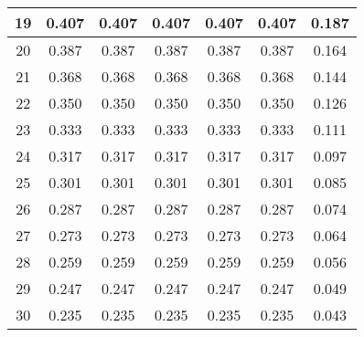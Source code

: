 \begin{table}
\begin{tabular}{|l|l|l|l|l|l|l|}
\hline
\multicolumn{1}{|c|}{19} & \multicolumn{1}{c|}{0.407} & \multicolumn{1}{c|}{0.407} & \multicolumn{1}{c|}{0.407} & \multicolumn{1}{c|}{0.407} & \multicolumn{1}{c|}{0.407} & \multicolumn{1}{c|}{0.187} \\ 
\hline
\multicolumn{1}{|c|}{20} & \multicolumn{1}{c|}{0.387} & \multicolumn{1}{c|}{0.387} & \multicolumn{1}{c|}{0.387} & \multicolumn{1}{c|}{0.387} & \multicolumn{1}{c|}{0.387} & \multicolumn{1}{c|}{0.164} \\ 
\hline
\multicolumn{1}{|c|}{21} & \multicolumn{1}{c|}{0.368} & \multicolumn{1}{c|}{0.368} & \multicolumn{1}{c|}{0.368} & \multicolumn{1}{c|}{0.368} & \multicolumn{1}{c|}{0.368} & \multicolumn{1}{c|}{0.144} \\ 
\hline
\multicolumn{1}{|c|}{22} & \multicolumn{1}{c|}{0.350} & \multicolumn{1}{c|}{0.350} & \multicolumn{1}{c|}{0.350} & \multicolumn{1}{c|}{0.350} & \multicolumn{1}{c|}{0.350} & \multicolumn{1}{c|}{0.126} \\ 
\hline
\multicolumn{1}{|c|}{23} & \multicolumn{1}{c|}{0.333} & \multicolumn{1}{c|}{0.333} & \multicolumn{1}{c|}{0.333} & \multicolumn{1}{c|}{0.333} & \multicolumn{1}{c|}{0.333} & \multicolumn{1}{c|}{0.111} \\ 
\hline
\multicolumn{1}{|c|}{24} & \multicolumn{1}{c|}{0.317} & \multicolumn{1}{c|}{0.317} & \multicolumn{1}{c|}{0.317} & \multicolumn{1}{c|}{0.317} & \multicolumn{1}{c|}{0.317} & \multicolumn{1}{c|}{0.097} \\ 
\hline
\multicolumn{1}{|c|}{25} & \multicolumn{1}{c|}{0.301} & \multicolumn{1}{c|}{0.301} & \multicolumn{1}{c|}{0.301} & \multicolumn{1}{c|}{0.301} & \multicolumn{1}{c|}{0.301} & \multicolumn{1}{c|}{0.085} \\ 
\hline
\multicolumn{1}{|c|}{26} & \multicolumn{1}{c|}{0.287} & \multicolumn{1}{c|}{0.287} & \multicolumn{1}{c|}{0.287} & \multicolumn{1}{c|}{0.287} & \multicolumn{1}{c|}{0.287} & \multicolumn{1}{c|}{0.074} \\ 
\hline
\multicolumn{1}{|c|}{27} & \multicolumn{1}{c|}{0.273} & \multicolumn{1}{c|}{0.273} & \multicolumn{1}{c|}{0.273} & \multicolumn{1}{c|}{0.273} & \multicolumn{1}{c|}{0.273} & \multicolumn{1}{c|}{0.064} \\ 
\hline
\multicolumn{1}{|c|}{28} & \multicolumn{1}{c|}{0.259} & \multicolumn{1}{c|}{0.259} & \multicolumn{1}{c|}{0.259} & \multicolumn{1}{c|}{0.259} & \multicolumn{1}{c|}{0.259} & \multicolumn{1}{c|}{0.056} \\ 
\hline
\multicolumn{1}{|c|}{29} & \multicolumn{1}{c|}{0.247} & \multicolumn{1}{c|}{0.247} & \multicolumn{1}{c|}{0.247} & \multicolumn{1}{c|}{0.247} & \multicolumn{1}{c|}{0.247} & \multicolumn{1}{c|}{0.049} \\ 
\hline
\multicolumn{1}{|c|}{30} & \multicolumn{1}{c|}{0.235} & \multicolumn{1}{c|}{0.235} & \multicolumn{1}{c|}{0.235} & \multicolumn{1}{c|}{0.235} & \multicolumn{1}{c|}{0.235} & \multicolumn{1}{c|}{0.043} \\ 
\hline
\end{tabular}
\label{tblavaimain:1}
\end{table}


